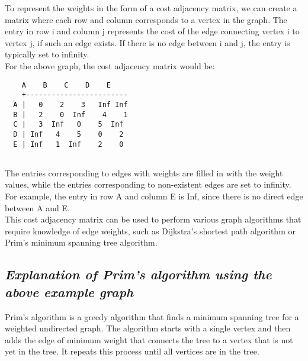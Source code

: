 \documentclass{article}
\begin{document}
To represent the weights in the form of a cost adjacency matrix, we can create a matrix where each row and column corresponds to a vertex in the graph. The entry in row i and column j represents the cost of the edge connecting vertex i to vertex j, if such an edge exists. If there is no edge between i and j, the entry is typically set to infinity.\\

For the above graph, the cost adjacency matrix would be:
\begin{lstlisting}
	A    B    C    D    E
	+------------------------
  A |   0    2    3   Inf Inf
  B |   2    0  Inf    4    1
  C |   3  Inf   0    5  Inf
  D | Inf   4    5    0    2
  E | Inf   1  Inf    2    0
  
\end{lstlisting}
The entries corresponding to edges with weights are filled in with the weight values, while the entries corresponding to non-existent edges are set to infinity. For example, the entry in row A and column E is Inf, since there is no direct edge between A and E.\\

This cost adjacency matrix can be used to perform various graph algorithms that require knowledge of edge weights, such as Dijkstra's shortest path algorithm or Prim's minimum spanning tree algorithm.
\subsection{\textit{Explanation of Prim’s algorithm using the above example graph}}
Prim's algorithm is a greedy algorithm that finds a minimum spanning tree for a weighted undirected graph. The algorithm starts with a single vertex and then adds the edge of minimum weight that connects the tree to a vertex that is not yet in the tree. It repeats this process until all vertices are in the tree.\\
\end{document}
